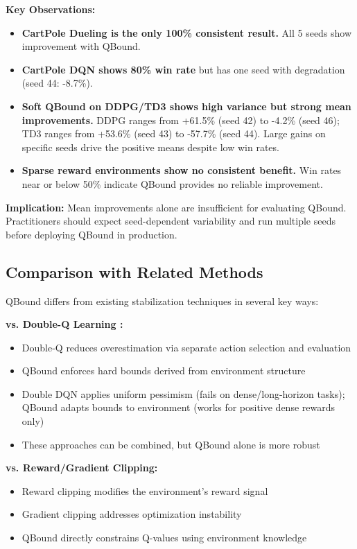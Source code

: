 \documentclass[11pt]{article}
\theoremstyle{definition}
\theoremstyle{remark}
\begin{document}
\textbf{Key Observations:}
\begin{itemize}
    \item \textbf{CartPole Dueling is the only 100\% consistent result.} All 5 seeds show improvement with QBound.
    \item \textbf{CartPole DQN shows 80\% win rate} but has one seed with degradation (seed 44: -8.7\%).
    \item \textbf{Soft QBound on DDPG/TD3 shows high variance but strong mean improvements.} DDPG ranges from +61.5\% (seed 42) to -4.2\% (seed 46); TD3 ranges from +53.6\% (seed 43) to -57.7\% (seed 44). Large gains on specific seeds drive the positive means despite low win rates.
    \item \textbf{Sparse reward environments show no consistent benefit.} Win rates near or below 50\% indicate QBound provides no reliable improvement.
\end{itemize}

\textbf{Implication:} Mean improvements alone are insufficient for evaluating QBound. Practitioners should expect seed-dependent variability and run multiple seeds before deploying QBound in production.

\subsection{Comparison with Related Methods}

QBound differs from existing stabilization techniques in several key ways:

\textbf{vs. Double-Q Learning \citep{van2016deep}:}
\begin{itemize}
    \item Double-Q reduces overestimation via separate action selection and evaluation
    \item QBound enforces hard bounds derived from environment structure
    \item  Double DQN applies uniform pessimism (fails on dense/long-horizon tasks); QBound adapts bounds to environment (works for positive dense rewards only)
    \item These approaches can be combined, but QBound alone is more robust
\end{itemize}

\textbf{vs. Reward/Gradient Clipping:}
\begin{itemize}
    \item Reward clipping modifies the environment's reward signal
    \item Gradient clipping addresses optimization instability
    \item QBound directly constrains Q-values using environment knowledge
\end{itemize}
\end{document}
